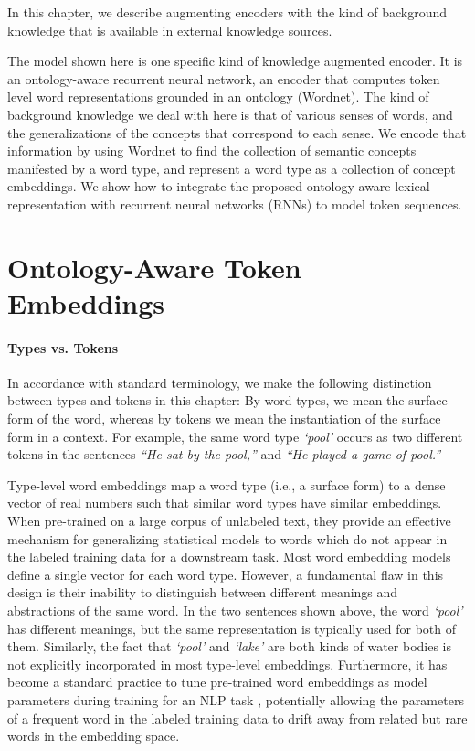 In this chapter, we describe augmenting encoders with the kind of background
knowledge that is available in external knowledge sources.

The model shown here is one specific kind of knowledge augmented encoder. It is an
ontology-aware recurrent neural network, an encoder that computes token level 
word representations grounded in an ontology (Wordnet).
The kind of background knowledge we deal with here is that of various senses of
words, and the generalizations of the concepts that correspond to each sense.
We encode that information by using Wordnet to find the 
collection of semantic concepts manifested by a word type, and represent a word 
type as a collection of concept embeddings. We show
how to integrate the proposed ontology-aware lexical representation with 
recurrent neural networks (RNNs) to model token sequences.

\section{Ontology-Aware Token Embeddings}
\paragraph{Types vs. Tokens} In accordance with standard terminology, we make
the following distinction 
between types and tokens in this chapter: By word types, we mean the surface form 
of the word, whereas by tokens we mean the instantiation of the surface form in 
a context. For example, the same word type \textit{`pool'} occurs as two 
different tokens in the sentences \textit{``He sat by the pool,''} and 
\textit{``He played a game of pool.''}

Type-level word embeddings map a word type (i.e., a surface form) to a dense 
vector of real numbers such that similar word types have similar embeddings. 
When pre-trained on a large corpus of unlabeled text, they provide an effective 
mechanism for generalizing statistical models to words which do not appear in 
the labeled training data for a downstream task. Most word embedding models 
define a single vector for each word type. However, a 
fundamental flaw in this design is their inability to distinguish between 
different meanings and abstractions of the same word. In the two sentences shown 
above, the word \textit{`pool'} has different meanings, but the same 
representation is typically used for both of them. Similarly, the fact that 
\textit{`pool'} and \textit{`lake'} are both kinds of water bodies is not 
explicitly incorporated in most type-level embeddings.
Furthermore, it has become a standard practice to tune pre-trained word 
embeddings as model parameters during training for an NLP task 
\cite[e.g.,][]{chen:14,lample:16}, potentially allowing the parameters of a 
frequent word in the labeled training data to drift away from related but rare 
words in the embedding space. 

